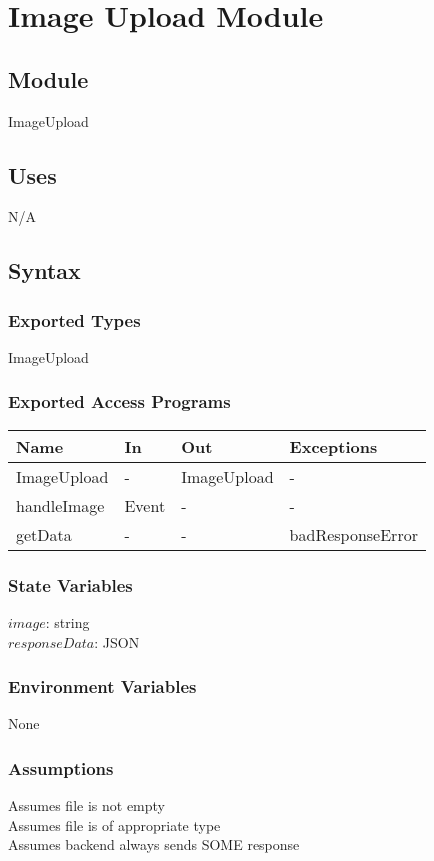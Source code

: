 \documentclass[12pt, titlepage]{article}
\begin{document}
\section{Image Upload Module} \label{ImageUpload} 
\subsection{Module}
ImageUpload
\subsection{Uses}
N/A
\subsection{Syntax}
\subsubsection{Exported Types}
ImageUpload
\subsubsection{Exported Access Programs}
\begin{center}
	\begin{tabular}{p{3cm} p{4cm} p{4cm} p{3cm}}
		
		\hline
		\textbf{Name} & \textbf{In} & \textbf{Out} & \textbf{Exceptions} \\
		\hline
		ImageUpload & - & ImageUpload &- \\
		handleImage & Event & - & - \\
		getData & - & - & badResponseError \\
		\hline
	\end{tabular}
\end{center}
\subsubsection{State Variables}
$image$: string\\
$responseData$: JSON
\subsubsection{Environment Variables}
None
\subsubsection{Assumptions}
Assumes file is not empty\\
Assumes file is of appropriate type\\
Assumes backend always sends SOME response
\end{document}
